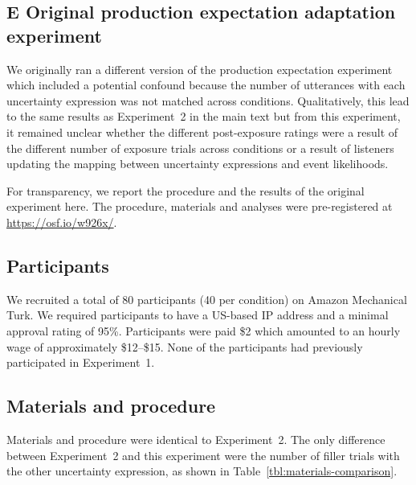 \documentclass[man, floatsintext]{apa6}
\begin{document}
\pagebreak
\FloatBarrier

\subsection*{E Original production expectation adaptation experiment}

We originally ran a different version of the production expectation experiment which included a potential confound because the number of utterances
with each uncertainty expression was not matched across conditions. Qualitatively, this lead to the same results as Experiment~2 in the main text 
but from this experiment, it remained unclear whether the different post-exposure ratings were a result of the different number of exposure trials
across conditions or a result of listeners updating the mapping between uncertainty expressions and event likelihoods.  

For transparency, we report the procedure and the results of the original experiment here. The procedure, materials and analyses were pre-registered at \url{https://osf.io/w926x/}.

\subsection*{Participants}
We recruited a total of 80 participants (40 per condition) on Amazon Mechanical Turk. 
We required participants to have a US-based IP address and a minimal approval rating 
of 95\%. Participants were paid \$2 which amounted to an hourly wage of approximately 
\$12--\$15. None of the participants had previously participated in Experiment~1.

\subsection*{Materials and procedure}

Materials and procedure were identical to Experiment~2. The only difference between Experiment~2 and this experiment were the number of filler trials with the other uncertainty expression, as shown in Table~\ref{tbl:materials-comparison}.
\end{document}
